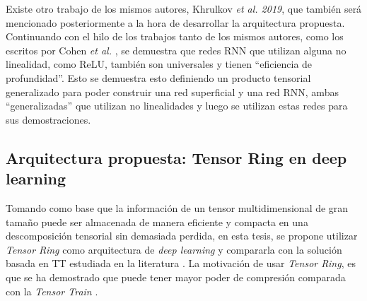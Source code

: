\documentclass[spanish]{article}
\theoremstyle{definition}
\theoremstyle{remark}
\numberwithin{equation}{section}
\numberwithin{equation}{section} %
\begin{document}
Existe otro trabajo de los mismos autores, Khrulkov \textit{ et al. 2019}\cite{khrulkov2019generalized}, que también será mencionado posteriormente a la hora de desarrollar la arquitectura propuesta. Continuando con el hilo de los trabajos tanto de los mismos autores, como los escritos por Cohen \textit{ et al.} \cite{cohen2016expressive} \cite{cohen2016convolutional}, se demuestra que redes RNN que utilizan alguna no linealidad, como ReLU, también son universales y tienen ``eficiencia de profundidad''. Esto se demuestra esto definiendo un producto tensorial generalizado para poder construir una red superficial y una red RNN, ambas ``generalizadas'' que utilizan no linealidades y luego se utilizan estas redes para sus demostraciones. 

\subsection{Arquitectura propuesta: Tensor Ring en deep learning}
\label{ssec:arqTensoRing}
Tomando como base que la información de un tensor multidimensional de gran tamaño puede ser almacenada de manera eficiente y compacta en una descomposición tensorial sin demasiada perdida, en esta tesis, se propone utilizar  \textit{Tensor Ring} como arquitectura de  \textit{deep learning} y compararla con la solución basada en TT estudiada en la literatura \cite{cohen2016expressive,khrulkov2017expressive,khrulkov2019generalized}. La motivación de usar \textit{Tensor Ring}, es que se ha demostrado que puede tener mayor poder de compresión comparada con la \textit{Tensor Train} \cite{zhao2016tensor}.
\end{document}
